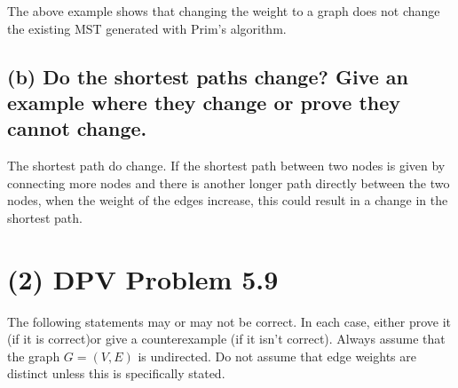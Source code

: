 \documentclass[10pt,letterpaper]{article}
\begin{document}
\noindent The above example shows that changing the weight to a graph does not change the existing MST generated with Prim's algorithm. 
\subsection*{(b) Do the shortest paths change? Give an example where they change or prove they cannot change.}
The shortest path do change. If the shortest path between two nodes is given by connecting more nodes and there is another longer path directly between the two nodes, when the weight of the edges increase, this could result in a change in the shortest path. 
\begin{figure}[h!]
\centering
{}
\hfill
{}
\end{figure}

\section*{(2) DPV Problem 5.9}
\noindent The following statements may or may not be correct. In each case, either prove it (if it is correct)or give a counterexample (if it isn't correct). Always assume that the graph $G = (V, E)$ is undirected. Do not assume that edge weights are distinct unless this is specifically stated. 
\end{document}
